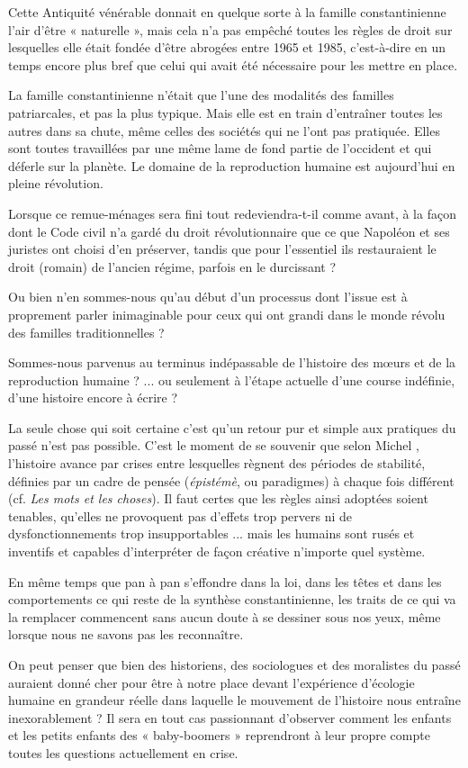  Cette Antiquité vénérable donnait en quelque sorte à la famille constantinienne l'air d'être « naturelle », mais cela n'a pas empêché toutes les règles de droit sur lesquelles elle était fondée d'être abrogées entre 1965 et 1985, c'est-à-dire en un temps encore plus bref que celui qui avait été nécessaire pour les mettre en place. 
 
 La famille constantinienne n'était que l'une des modalités des familles patriarcales, et pas la plus typique. Mais elle est en train d'entraîner toutes les autres dans sa chute, même celles des sociétés qui ne l'ont pas pratiquée. Elles sont toutes travaillées par une même lame de fond partie de l'occident et qui déferle sur la planète. Le domaine de la reproduction humaine est aujourd'hui en pleine révolution.
  
 Lorsque ce remue-ménages sera fini tout redeviendra-t-il comme avant, à la façon dont le Code civil n'a gardé du droit révolutionnaire que ce que Napoléon et ses juristes ont choisi d'en préserver, tandis que pour l'essentiel ils restauraient le droit (romain) de l'ancien régime, parfois en le durcissant ? 
 
 Ou bien n'en sommes-nous qu'au début d'un processus dont l'issue est à proprement parler inimaginable pour ceux qui ont grandi dans le monde révolu des familles traditionnelles ?

 Sommes-nous parvenus au terminus indépassable de l'histoire des mœurs et de la reproduction humaine ? ... ou seulement à l'étape actuelle d'une course indéfinie, d'une histoire encore à écrire ? 
 
 La seule chose qui soit certaine c'est qu'un retour pur et simple aux pratiques du passé n'est pas possible. C'est le moment de se souvenir que selon Michel , l'histoire avance par crises entre lesquelles règnent des périodes de stabilité, définies par un cadre de pensée (\emph{épistémè}, ou paradigmes) à chaque fois différent (cf. \emph{Les mots et les choses}). Il faut certes que les règles ainsi adoptées soient tenables, qu'elles ne provoquent pas d'effets trop pervers ni de dysfonctionnements trop insupportables ... mais les humains sont rusés et inventifs et capables d'interpréter de façon créative n'importe quel système.

 En même temps que pan à pan s'effondre dans la loi, dans les têtes et dans les comportements ce qui reste de la synthèse constantinienne, les traits de ce qui va la remplacer commencent sans aucun doute à se dessiner sous nos yeux, même lorsque nous ne savons pas les reconnaître.

On peut penser que bien des historiens, des sociologues et des moralistes du passé auraient donné cher pour être à notre place devant l'expérience d'écologie humaine en grandeur réelle dans laquelle le mouvement de l'histoire nous entraîne inexorablement ? Il sera en tout cas passionnant d'observer comment les enfants et les petits enfants des « baby-boomers » reprendront à leur propre compte toutes les questions actuellement en crise.

